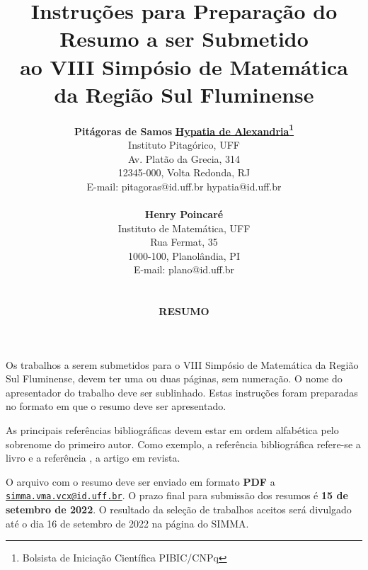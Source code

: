 \documentclass[a4paper,10pt]{article}
\begin{document}
\title{\vspace{-1cm} 
\Large{\bf Instruções para Preparação do Resumo a ser Submetido\\ 
ao VIII Simpósio de Matemática da Região Sul Fluminense}
}

\author{ 
{\bf {\large Pitágoras de Samos}} \hspace*{1cm} 
{\bf {\large \underline{Hypatia de Alexandria}\footnote{Bolsista de Iniciação Científica PIBIC/CNPq}}}  \\[4pt]
{\small Instituto Pitagórico, UFF} \\
{\small Av. Platão da Grecia, 314} \\
{\small 12345-000, Volta Redonda, RJ} \\
{\small E-mail: pitagoras@id.uff.br \hspace*{1cm}  hypatia@id.uff.br} 
\\
\\
{\bf {\large Henry Poincaré}}  \\[4pt]
{\small Instituto de Matemática, UFF} \\
{\small Rua Fermat, 35} \\
{\small 1000-100, Planolândia, PI} \\
{\small E-mail: plano@id.uff.br}
 \\
 \\
 \\
\textbf{RESUMO}
}

\date{}
\maketitle
\thispagestyle{fancy}


Os trabalhos a serem submetidos para o VIII Simpósio de Matemática da Região Sul Fluminense, devem ter uma ou duas páginas, sem numeração. O nome do apresentador do trabalho deve ser sublinhado. Estas instruções foram preparadas no formato em que o resumo deve ser apresentado. 


As principais referências bibliográficas devem estar em ordem alfabética pelo sobrenome do primeiro autor. Como exemplo, a referência bibliográfica \cite{hig} refere-se a livro e a referência
\cite{key1}, a artigo em revista.

O arquivo com o resumo deve ser enviado em formato \textbf{PDF} a \href{mailto:simma.vma.vcx@id.uff.br}{\tt\color{blue}simma.vma.vcx@id.uff.br}.  O prazo final para submissão dos resumos é \textbf{\color{red} 15 de setembro de 2022}. O resultado da seleção de trabalhos aceitos será divulgado até o dia 16 de setembro de 2022 na página do SIMMA.
\end{document}
